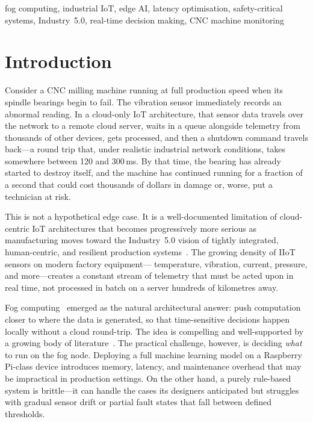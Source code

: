 \documentclass[conference]{IEEEtran}
\begin{document}
\begin{IEEEkeywords}
fog computing, industrial IoT, edge AI, latency optimisation,
safety-critical systems, Industry~5.0, real-time decision making,
CNC machine monitoring
\end{IEEEkeywords}


\section{Introduction}

Consider a CNC milling machine running at full production speed when
its spindle bearings begin to fail.
The vibration sensor immediately records an abnormal reading.
In a cloud-only IoT architecture, that sensor data travels over the
network to a remote cloud server, waits in a queue alongside telemetry
from thousands of other devices, gets processed, and then a shutdown
command travels back---a round trip that, under realistic industrial
network conditions, takes somewhere between 120 and 300\,ms.
By that time, the bearing has already started to destroy itself,
and the machine has continued running for a fraction of a second that
could cost thousands of dollars in damage or, worse, put a technician
at risk.

This is not a hypothetical edge case.
It is a well-documented limitation of cloud-centric IoT architectures
that becomes progressively more serious as manufacturing moves toward
the Industry~5.0 vision of tightly integrated, human-centric, and
resilient production systems~\cite{eu_industry5}.
The growing density of IIoT sensors on modern factory equipment---
temperature, vibration, current, pressure, and more---creates a
constant stream of telemetry that must be acted upon in real time, not
processed in batch on a server hundreds of kilometres away.

Fog computing~\cite{bonomi2012fog} emerged as the natural architectural
answer: push computation closer to where the data is generated, so that
time-sensitive decisions happen locally without a cloud round-trip.
The idea is compelling and well-supported by a growing body of
literature~\cite{shi2016edge,chiang2016fog,yousefpour2019fog}.
The practical challenge, however, is deciding \emph{what} to run on the
fog node.
Deploying a full machine learning model on a Raspberry Pi-class device
introduces memory, latency, and maintenance overhead that may be
impractical in production settings.
On the other hand, a purely rule-based system is brittle---it can
handle the cases its designers anticipated but struggles with gradual
sensor drift or partial fault states that fall between defined
thresholds.
\end{document}
